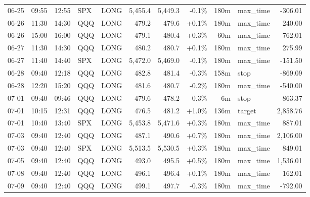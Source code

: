 \documentclass[11pt,a4paper,twoside]{article}
\begin{document}
\begin{center}
\begin{longtable}{>{\color{txtmain}}l l l l l r r r r >{\color{txtmain}}l r}
06-25 & 09:55 & 12:55 & SPX & LONG & 5,455.4 & 5,449.3 & \textcolor{lossred}{-0.1\%} & 180m & max\_time & \textcolor{lossred}{-306.01} \\
06-26 & 11:30 & 14:30 & QQQ & LONG & 479.2 & 479.6 & \textcolor{wingreen}{+0.1\%} & 180m & max\_time & \textcolor{wingreen}{240.00} \\
06-26 & 15:00 & 16:00 & QQQ & LONG & 479.1 & 480.4 & \textcolor{wingreen}{+0.3\%} & 60m & max\_time & \textcolor{wingreen}{762.01} \\
06-27 & 11:30 & 14:30 & QQQ & LONG & 480.2 & 480.7 & \textcolor{wingreen}{+0.1\%} & 180m & max\_time & \textcolor{wingreen}{275.99} \\
06-27 & 11:40 & 14:40 & SPX & LONG & 5,472.0 & 5,469.0 & \textcolor{lossred}{-0.1\%} & 180m & max\_time & \textcolor{lossred}{-151.50} \\
06-28 & 09:40 & 12:18 & QQQ & LONG & 482.8 & 481.4 & \textcolor{lossred}{-0.3\%} & 158m & stop & \textcolor{lossred}{-869.09} \\
06-28 & 12:20 & 15:20 & QQQ & LONG & 481.6 & 480.7 & \textcolor{lossred}{-0.2\%} & 180m & max\_time & \textcolor{lossred}{-540.00} \\
07-01 & 09:40 & 09:46 & QQQ & LONG & 479.6 & 478.2 & \textcolor{lossred}{-0.3\%} & 6m & stop & \textcolor{lossred}{-863.37} \\
07-01 & 10:15 & 12:31 & QQQ & LONG & 476.5 & 481.2 & \textcolor{wingreen}{+1.0\%} & 136m & target & \textcolor{wingreen}{2,858.76} \\
07-01 & 10:40 & 13:40 & SPX & LONG & 5,453.8 & 5,471.6 & \textcolor{wingreen}{+0.3\%} & 180m & max\_time & \textcolor{wingreen}{887.01} \\
07-03 & 09:40 & 12:40 & QQQ & LONG & 487.1 & 490.6 & \textcolor{wingreen}{+0.7\%} & 180m & max\_time & \textcolor{wingreen}{2,106.00} \\
07-03 & 09:40 & 12:40 & SPX & LONG & 5,513.5 & 5,530.5 & \textcolor{wingreen}{+0.3\%} & 180m & max\_time & \textcolor{wingreen}{849.01} \\
07-05 & 09:40 & 12:40 & QQQ & LONG & 493.0 & 495.5 & \textcolor{wingreen}{+0.5\%} & 180m & max\_time & \textcolor{wingreen}{1,536.01} \\
07-08 & 09:40 & 12:40 & QQQ & LONG & 496.1 & 496.4 & \textcolor{wingreen}{+0.1\%} & 180m & max\_time & \textcolor{wingreen}{162.01} \\
07-09 & 09:40 & 12:40 & QQQ & LONG & 499.1 & 497.7 & \textcolor{lossred}{-0.3\%} & 180m & max\_time & \textcolor{lossred}{-792.00} \\

\end{longtable}
\end{center}
\end{document}
